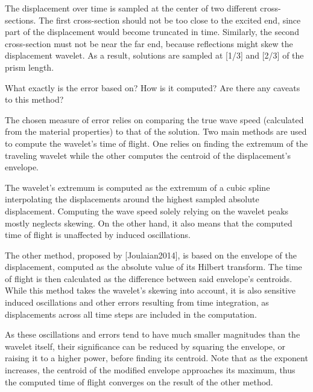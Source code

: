 The displacement over time is sampled at the center of two different cross-sections.
The first cross-section should not be too close to the excited end, since part of the
displacement would become truncated in time. Similarly, the second cross-section must
not be near the far end, because reflections might skew the displacement wavelet.
As a result, solutions are sampled at [1/3] and [2/3] of the prism length.

What exactly is the error based on?
How is it computed?
Are there any caveats to this method?

The chosen measure of error relies on comparing the true wave speed (calculated from
the material properties) to that of the solution. Two main methods are used to compute
the wavelet's time of flight. One relies on finding the extremum of the traveling wavelet
while the other computes the centroid of the displacement's envelope.

The wavelet's extremum is computed as the extremum of a cubic spline interpolating
the displacements around the highest sampled absolute displacement. Computing the wave
speed solely relying on the wavelet peaks mostly neglects skewing. On the other hand,
it also means that the computed time of flight is unaffected by induced oscillations.

The other method, proposed by [Joulaian2014], is based on the envelope of the displacement,
computed as the absolute value of its Hilbert transform. The time of flight is then
calculated as the difference between said envelope's centroids. While this method takes
the wavelet's skewing into account, it is also sensitive induced oscillations and other
errors resulting from time integration, as displacements across all time steps are
included in the computation.

As these oscillations and errors tend to have much smaller magnitudes than the wavelet
itself, their significance can be reduced by squaring the envelope, or raising it to
a higher power, before finding its centroid. Note that as the exponent increases, the
centroid of the modified envelope approaches its maximum, thus the computed time of
flight converges on the result of the other method.
